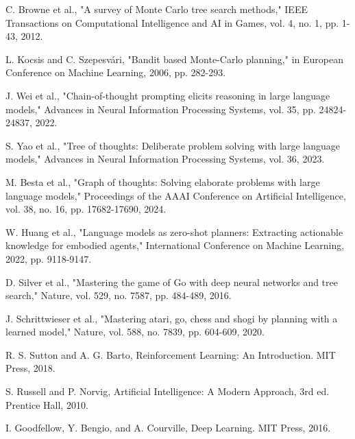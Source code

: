 \documentclass[conference]{IEEEtran}
\begin{document}
\begin{thebibliography}{00}
 C. Browne et al., "A survey of Monte Carlo tree search methods," IEEE Transactions on Computational Intelligence and AI in Games, vol. 4, no. 1, pp. 1-43, 2012.

 L. Kocsis and C. Szepesvári, "Bandit based Monte-Carlo planning," in European Conference on Machine Learning, 2006, pp. 282-293.

 J. Wei et al., "Chain-of-thought prompting elicits reasoning in large language models," Advances in Neural Information Processing Systems, vol. 35, pp. 24824-24837, 2022.

 S. Yao et al., "Tree of thoughts: Deliberate problem solving with large language models," Advances in Neural Information Processing Systems, vol. 36, 2023.

 M. Besta et al., "Graph of thoughts: Solving elaborate problems with large language models," Proceedings of the AAAI Conference on Artificial Intelligence, vol. 38, no. 16, pp. 17682-17690, 2024.

 W. Huang et al., "Language models as zero-shot planners: Extracting actionable knowledge for embodied agents," International Conference on Machine Learning, 2022, pp. 9118-9147.

 D. Silver et al., "Mastering the game of Go with deep neural networks and tree search," Nature, vol. 529, no. 7587, pp. 484-489, 2016.

 J. Schrittwieser et al., "Mastering atari, go, chess and shogi by planning with a learned model," Nature, vol. 588, no. 7839, pp. 604-609, 2020.

 R. S. Sutton and A. G. Barto, Reinforcement Learning: An Introduction. MIT Press, 2018.

 S. Russell and P. Norvig, Artificial Intelligence: A Modern Approach, 3rd ed. Prentice Hall, 2010.

 I. Goodfellow, Y. Bengio, and A. Courville, Deep Learning. MIT Press, 2016.

\end{thebibliography}
\end{document}
